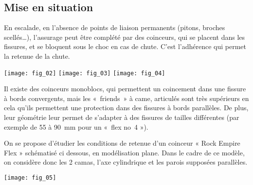 
\subsection*{Mise en situation}

En escalade, en l’absence de points de liaison permanents (pitons, broches scellés…), l’assurage peut être complété par des coinceurs, qui se placent dans les fissures, et se bloquent sous le choc en cas de chute. C’est l’adhérence qui permet la retenue de la chute.
\begin{center}
\texttt{[image: fig\_02]}
\texttt{[image: fig\_03]}
\texttt{[image: fig\_04]}
\end{center}
Il existe des coinceurs monoblocs, qui permettent un coincement dans une fissure à bords convergents, mais les 
«~friends~» à came, articulés sont très supérieurs en cela qu’ils permettent une protection dans des fissures à bords parallèles. De plus, leur géométrie leur permet de s’adapter à des fissures de tailles différentes (par exemple de 55 à \SI{90}{mm} pour un «~flex no~4 »).

On se propose d’étudier les conditions de retenue d’un coinceur « Rock Empire Flex » schématisé ci dessous, en modélisation plane. Dans le cadre de ce modèle, on considère donc les 2 camas, l'axe cylindrique et les parois supposées parallèles. 


\begin{center}
\texttt{[image: fig\_05]}
\end{center}

\ifprof
\begin{corrige}~\\
\end{corrige}
\else
\fi


\ifprof
\begin{corrige}~\\
\end{corrige}
\else
\fi

\ifprof
\begin{corrige}~\\
\end{corrige}
\else
\fi

\ifprof
\begin{corrige}~\\
\end{corrige}
\else
\fi

